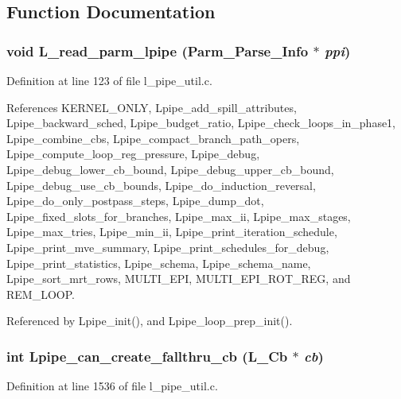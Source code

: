 \subsection{Function Documentation}
\subsubsection{\setlength{\rightskip}{0pt plus 5cm}void L\_\-read\_\-parm\_\-lpipe (Parm\_\-Parse\_\-Info $\ast$ {\em ppi})}\label{l__pipe__util_8c_6f5aa25c2a95b94ee73ac1b754207d70}




Definition at line 123 of file l\_\-pipe\_\-util.c.

References KERNEL\_\-ONLY, Lpipe\_\-add\_\-spill\_\-attributes, Lpipe\_\-backward\_\-sched, Lpipe\_\-budget\_\-ratio, Lpipe\_\-check\_\-loops\_\-in\_\-phase1, Lpipe\_\-combine\_\-cbs, Lpipe\_\-compact\_\-branch\_\-path\_\-opers, Lpipe\_\-compute\_\-loop\_\-reg\_\-pressure, Lpipe\_\-debug, Lpipe\_\-debug\_\-lower\_\-cb\_\-bound, Lpipe\_\-debug\_\-upper\_\-cb\_\-bound, Lpipe\_\-debug\_\-use\_\-cb\_\-bounds, Lpipe\_\-do\_\-induction\_\-reversal, Lpipe\_\-do\_\-only\_\-postpass\_\-steps, Lpipe\_\-dump\_\-dot, Lpipe\_\-fixed\_\-slots\_\-for\_\-branches, Lpipe\_\-max\_\-ii, Lpipe\_\-max\_\-stages, Lpipe\_\-max\_\-tries, Lpipe\_\-min\_\-ii, Lpipe\_\-print\_\-iteration\_\-schedule, Lpipe\_\-print\_\-mve\_\-summary, Lpipe\_\-print\_\-schedules\_\-for\_\-debug, Lpipe\_\-print\_\-statistics, Lpipe\_\-schema, Lpipe\_\-schema\_\-name, Lpipe\_\-sort\_\-mrt\_\-rows, MULTI\_\-EPI, MULTI\_\-EPI\_\-ROT\_\-REG, and REM\_\-LOOP.

Referenced by Lpipe\_\-init(), and Lpipe\_\-loop\_\-prep\_\-init().
\subsubsection{\setlength{\rightskip}{0pt plus 5cm}int Lpipe\_\-can\_\-create\_\-fallthru\_\-cb (L\_\-Cb $\ast$ {\em cb})}\label{l__pipe__util_8c_bc942e4e2d34aabcfb238a6102ac9618}




Definition at line 1536 of file l\_\-pipe\_\-util.c.

